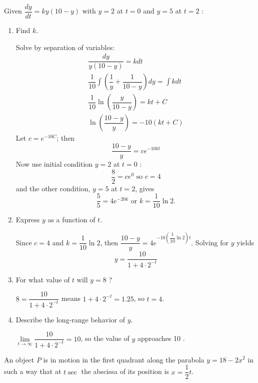\newpage





\question
Given $\dfrac{d y}{d t}=k y(10-y)$ with $y=2$ at $t=0$ and $y=5$ at $t=2$ :
\begin{enumerate}
\renewcommand{\labelenumi}{(\alph{enumi})}
\item Find $k$.
\begin{solutionorbox}[2in]
Solve by separation of variables:
\[
\begin{gathered}
\dfrac{d y}{y(10-y)}=k d t \\
\dfrac{1}{10} \int\left(\dfrac{1}{y}+\dfrac{1}{10-y}\right) d y=\int k d t \\
\dfrac{1}{10} \ln \left(\dfrac{y}{10-y}\right)=k t+C \\
\ln \left(\dfrac{10-y}{y}\right)=-10(k t+C)
\end{gathered}
\]
Let $c=e^{-10 C}$; then
\[
\dfrac{10-y}{y}=c e^{-10 k t}
\]
Now use initial condition $y=2$ at $t=0$ :
\[
\dfrac{8}{2}=c e^{0} \text { so } c=4
\]
and the other condition, $y=5$ at $t=2$, gives
\[
\dfrac{5}{5}=4 e^{-20 k} \text { or } k=\dfrac{1}{10} \ln 2 .
\]
\end{solutionorbox}
\item Express $y$ as a function of $t$.
\begin{solutionorbox}[1.5in]
Since $c=4$ and $k=\dfrac{1}{10} \ln 2$, then $\dfrac{10-y}{y}=4 e^{-10\left(\dfrac{1}{10} \ln 2\right) t}$. Solving for $y$ yields
\[
y=\dfrac{10}{1+4 \cdot 2^{-t}}
\]
\end{solutionorbox}
\item For what value of $t$ will $y=8$ ?
\begin{solutionorbox}[1in]
$8=\dfrac{10}{1+4 \cdot 2^{-t}}$ means $1+4 \cdot 2^{-t}=1.25$, so $t=4$.
\end{solutionorbox}
\item Describe the long-range behavior of $y$.
\begin{solutionorbox}[1in]
$\lim\limits_{t \to \infty} \dfrac{10}{1+4 \cdot 2^{-t}}=10$, so the value of $y$ approaches 10 .
\end{solutionorbox}
\end{enumerate}






\newpage






\question
An object $P$ is in motion in the first quadrant along the parabola $y=18-2 x^{2}$ in such a way that at $t \sec$ the abscissa of its position is $x=\dfrac{1}{2} t$.

